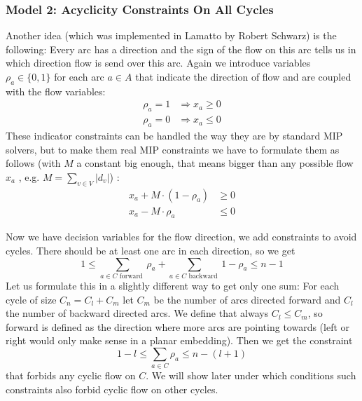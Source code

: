 \subsubsection{Model 2: Acyclicity Constraints On All Cycles}

Another idea (which was implemented in Lamatto by Robert Schwarz) is the following: Every arc has a direction and the 
sign of the flow on this arc tells us in which direction flow is send over this arc. Again we introduce variables 
$\rho_a\in \{0,1\}$ for each arc $a\in A$ that indicate the direction of flow and are coupled with the flow variables:
\begin{align*}
\rho_a=1 & \Rightarrow x_a\ge 0 \\
\rho_a=0 & \Rightarrow x_a\le 0
\end{align*}
These indicator constraints can be handled the way they are by standard MIP solvers, but to make them real MIP 
constraints we have to formulate them as follows (with $M$ a constant big enough, that means bigger than any possible 
flow $x_a$ , e.g. $M=\sum_{v\in V}|d_v|$) :
\begin{align*}
 x_a + M\cdot (1-\rho_a) &\ge 0\\
 x_a - M\cdot \rho_a & \le 0
\end{align*}



Now we have decision variables for the flow direction, we add constraints to avoid cycles. There should be at least 
one arc in each direction, so we get $$ 1\le\sum_{a\in C\textrm{ forward }} \rho_a + \sum_{a\in C\textrm{ backward 
}}1-\rho_a\le n-1$$
Let us formulate this in a slightly different way to get only one sum: For each cycle of size $C_n=C_l+C_m$ 
let $C_m$ be the number of arcs directed forward and $C_l$ the number of backward directed arcs. We define that always 
$C_l\le C_m$, so forward is defined as the direction where more arcs are pointing towards (left or right would only 
make 
sense in a planar embedding). Then we get the constraint $$1-l \le \sum_{a\in C}\rho_a\le n-(l+1)$$ that forbids any
cyclic flow on $C$. We will show later under which conditions such constraints also forbid cyclic flow on other cycles. 

